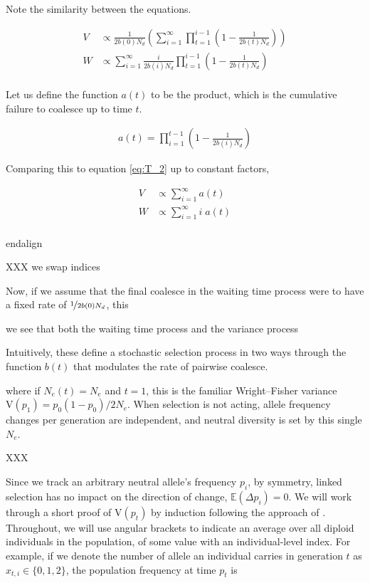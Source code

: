 \documentclass[11pt]{article}
\newcommand{\E}{\mathbb{E}}
\newcommand{\V}{\text{V}}
\begin{document}
Note the similarity between the equations.

\begin{align}
  V &\propto \frac{1}{2b(0)N_d}\left(\sum_{i=1}^\infty \prod_{t=1}^{i-1} \left(1 - \frac{1}{2b(t)N_d}\right) \right) \\
  W &\propto \sum_{i=1}^\infty \frac{i}{2 b(i) N_d} \prod_{t=1}^{i-1} \left(1-\frac{1}{2 b(t) N_d}\right) \\
\end{align}


Let us define the function $a(t)$ to be the product, which is the cumulative
failure to coalesce up to time $t$.

\begin{align}
  a(t) = \prod_{i=1}^{t-1} \left( 1-\frac{1}{2 b(i) N_d} \right)
\end{align}

Comparing this to equation \eqref{eq:T_2} up to constant factors, 

\begin{align}
  V &\propto \sum_{i=1}^\infty a(t) \\
  W &\propto \sum_{i=1}^\infty i \; a(t) \\
\end{align}

end{align}

XXX we swap indices

Now, if we assume that the final coalesce in the waiting time process were to
have a fixed rate of $\nicefrac{1}{2b(0)N_d}$, this 

we see that both the waiting time process and the variance process 

Intuitively, these define a stochastic selection process in two ways through
the function $b(t)$ that modulates the rate of pairwise coalesce. 







where if $N_e(t) = N_e$ and $t=1$, this is the familiar Wright--Fisher variance
$\V(p_1) = p_0(1-p_0) / 2N_e$. When selection is not acting, allele frequency
changes per generation are independent, and neutral diversity is set by this
single $N_e$. 

XXX

Since we track an arbitrary neutral allele's frequency $p_i$, by symmetry,
linked selection has no impact on the direction of change, $\E(\Delta p_i) =
0$. We will work through a short proof of $\V(p_t)$ by induction following the
approach of \textcite{Santiago1995-hx}. Throughout, we will use angular
brackets to indicate an average over all diploid individuals in the population,
of some value with an individual-level index. For example, if we denote the
number of allele an individual carries in generation $t$ as $x_{t,i} \in \{0,
1, 2\}$, the population frequency at time $p_t$ is
\end{document}
